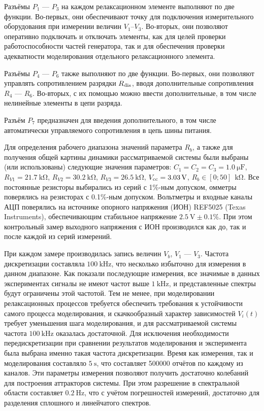 Разъёмы $P_1$ --- $P_3$ на каждом  релаксационном элементе
выполняют по две функции.
Во-первых, они обеспечивают точку для подключения измерительного
оборудования при измерении величин $V_1$--$V_3$.
Во-вторых, они позволяют оперативно
подключать и отключать элементы, как для целей
проверки работоспособности частей генератора,
так и для обеспечения проверки адекватности моделирования
отдельного релаксационного элемента.


Разъёмы $P_4$ --- $P_6$
также выполняют по две функции.
Во-первых, они позволяют управлять сопротивлением
разрядки $R_\mathrm{dis}$, вводя дополнительные сопротивления
$R_4$ --- $R_6$.
Во-вторых, с их помощью можно ввести дополнительные,
в том числе нелинейные элементы в цепи разряда.

Разъём $P_7$
предназначен для введения дополнительного,
в том числе автоматически управляемого сопротивления
в цепь шины питания.

Для определения рабочего диапазона значений параметра $R_b$,
а также для получения общей картины динамики рассматриваемой системы
были выбраны (или использованы) следующие значения параметров:
$C_1 = C_2 = C_3 = \SI{1.0}{\micro\farad}$,
$R_{V1} = \SI{21.7}{\kilo\ohm}$,
$R_{V2} = \SI{30.2}{\kilo\ohm}$,
$R_{V3} = \SI{26.5}{\kilo\ohm}$,
$V_\mathrm{cc} = \SI{3.03}{\volt}$,
$R_{b} \in [0;50]~ \SI{}{\kilo\ohm}$.
Все постоянные резисторы выбирались из серий с 1\%-ным допуском,
омметры поверялись на резисторах с 0.1\%-ным допуском.
Вольтметры и входные каналы АЦП
поверялись на источнике опорного напряжения (ИОН)
REF5025 (Texas Instruments), обеспечивающим
стабильное напряжение $\SI{2.5}{\volt} \pm 0.1 \%$.
При этом контрольный замер выходного напряжения с ИОН
производился как до, так и после каждой из серий измерений.

При каждом замере
производилась запись величин
$V_b$, $V_1$ --- $V_3$.
Частота дискретизации составляла $\SI{100}{\kilo\hertz}$,
что несколько избыточно для измерения в данном диапазоне.
Как показали последующие измерения,
все значимые в данных экспериментах сигналы не имеют
частот выше $\SI{1}{\kilo\hertz}$,
и представленные спектры будут ограничены этой частотой.
Тем не менее, при моделировании релаксационных
процессов требуется обеспечить требования к устойчивости
самого процесса моделирования, и скачкообразный
характер зависимостей $V_i(t)$
требует уменьшения шага моделирования, и для
рассматриваемой системы частота
$\SI{100}{\kilo\hertz}$ оказалась достаточной.
Для исключения необходимости передискретизации
при сравнении результатов моделирования
и эксперимента была выбрана именно такая частота дискретизации.
Время как измерения, так и моделирования составляло
$\SI{5}{\s}$, что составляет 500000 отчётов
по каждому из каналов.
Эти параметры измерения позволяют получить достаточно
колебаний для построения аттракторов системы.
При этом разрешение в спектральной области
составляет
$\SI{0.2}{\hertz}$, что с учётом погрешностей измерений,
достаточно для разделения сплошного и линейчатого спектров.

